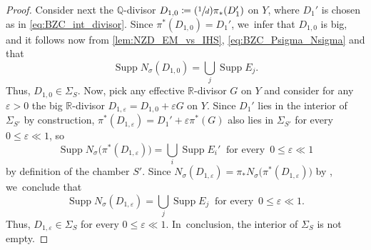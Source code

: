 \documentclass[10pt]{amsart}
\newcommand{\Psfrac}[2]{(\sfrac{#1}{#2})}
\theoremstyle{plain}
\theoremstyle{definition}
\newcommand{\Q}{\mathbb{Q}}
\newcommand{\R}{\mathbb{R}}
\DeclareMathOperator{\Supp}{Supp}
\begin{document}
\begin{proof}
Consider next the $\Q$\nobreakdash-divisor $D_{1,0} \coloneqq \Psfrac{1}{d} \pi_* (D_1')$ on $Y$, where $D_1'$ is chosen as in \eqref{eq:BZC_int_divisor}. Since $\pi^* (D_{1,0}) = D_1'$, we~infer that $D_{1,0}$ is big, and it follows now from \autoref{lem:NZD_EM_vs_IHS}, \eqref{eq:BZC_Psigma_Nsigma} and \cite[Th.\,III.5.16]{Nak04book} that
\[
\Supp N_\sigma (D_{1,0}) = \bigcup_j \Supp E_j.
\]
Thus, $D_{1,0} \in \Sigma_S$. Now, pick any effective $\R$\nobreakdash-divisor $G$ on $Y$ and consider for any $\varepsilon > 0$ the big $\R$\nobreakdash-divisor $D_{1,\varepsilon}=D_{1,0} + \varepsilon G$ on $Y$. Since $D_1'$ lies in the interior of $\Sigma_{S'}$ by construction, $\pi^*(D_{1,\varepsilon}) = D_1'+\varepsilon \pi^*(G)$ also lies in $\Sigma_{S'}$ for every $0 \leq \varepsilon \ll 1$, so~\[
\Supp N_\sigma \bigl(\pi^*(D_{1,\varepsilon}) \bigr) = \bigcup_i \Supp E_i' \ \text{ for every } \,0 \leq \varepsilon \ll 1
\]
by definition of the chamber $S'$. Since $N_\sigma (D_{1,\varepsilon}) = \pi_* N_\sigma \bigl(\pi^*(D_{1,\varepsilon}) \bigr)$ by \cite[Th.\,III.5.16]{Nak04book}, we~conclude that
\[
\Supp N_\sigma (D_{1,\varepsilon}) = \bigcup_j \Supp E_j \ \text{ for every } \,0 \leq \varepsilon \ll 1.
\]
Thus, $D_{1,\varepsilon} \in \Sigma_S$ for every $0 \leq \varepsilon \ll 1$. In~conclusion, the interior of $\Sigma_S$ is not empty.
\end{proof}
\end{document}
